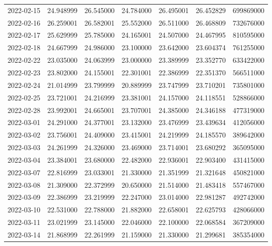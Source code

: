\begin{tabular}{lrrrrrr}
2022-02-15 &   24.948999 &   26.545000 &   24.784000 &   26.495001 &   26.452829 &   699869000 \\
2022-02-16 &   26.259001 &   26.582001 &   25.552000 &   26.511000 &   26.468809 &   732676000 \\
2022-02-17 &   25.629999 &   25.785000 &   24.165001 &   24.507000 &   24.467995 &   810595000 \\
2022-02-18 &   24.667999 &   24.986000 &   23.100000 &   23.642000 &   23.604374 &   761255000 \\
2022-02-22 &   23.035000 &   24.063999 &   23.000000 &   23.389999 &   23.352770 &   633422000 \\
2022-02-23 &   23.802000 &   24.155001 &   22.301001 &   22.386999 &   22.351370 &   566511000 \\
2022-02-24 &   21.014999 &   23.799999 &   20.889999 &   23.747999 &   23.710201 &   735801000 \\
2022-02-25 &   23.721001 &   24.216999 &   23.381001 &   24.157000 &   24.118551 &   528866000 \\
2022-02-28 &   23.992001 &   24.665001 &   23.707001 &   24.385000 &   24.346188 &   477319000 \\
2022-03-01 &   24.291000 &   24.377001 &   23.132000 &   23.476999 &   23.439634 &   412056000 \\
2022-03-02 &   23.756001 &   24.409000 &   23.415001 &   24.219999 &   24.185570 &   389642000 \\
2022-03-03 &   24.261999 &   24.326000 &   23.469000 &   23.714001 &   23.680292 &   365095000 \\
2022-03-04 &   23.384001 &   23.680000 &   22.482000 &   22.936001 &   22.903400 &   431415000 \\
2022-03-07 &   22.816999 &   23.033001 &   21.330000 &   21.351999 &   21.321648 &   450821000 \\
2022-03-08 &   21.309000 &   22.372999 &   20.650000 &   21.514000 &   21.483418 &   557467000 \\
2022-03-09 &   22.386999 &   23.219999 &   22.247000 &   23.014000 &   22.981287 &   492742000 \\
2022-03-10 &   22.531000 &   22.788000 &   21.882000 &   22.658001 &   22.625793 &   428066000 \\
2022-03-11 &   23.021999 &   23.145000 &   22.046000 &   22.100000 &   22.068584 &   367209000 \\
2022-03-14 &   21.868999 &   22.261999 &   21.159000 &   21.330000 &   21.299681 &   385354000 \\

\end{tabular}
